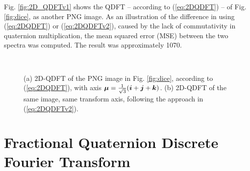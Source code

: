 Fig. \ref{fig:2D_QDFTv1} shows the QDFT -- according to (\ref{eq:2DQDFT}) -- of Fig. \ref{fig:dice}, as another PNG image. As an illustration of the difference in using (\ref{eq:2DQDFT}) or (\ref{eq:2DQDFTv2}), caused by the lack of commutativity in quaternion multiplication, the mean squared error (MSE) between the two spectra was computed. The result was approximately 1070. %



\begin{figure}
\centering
{}~
\caption{(a) 2D-QDFT of the PNG image in Fig. \ref{fig:dice}, according to (\ref{eq:2DQDFT}), with axis $ \boldsymbol{\mu} = \frac{1}{\sqrt{3}}(\boldsymbol{i} + \boldsymbol{j} + \boldsymbol{k}) $. (b) 2D-QDFT of the same image, same transform axis, following the approach in (\ref{eq:2DQDFTv2}).}
\label{fig:QDFT}
\end{figure}

\section{Fractional Quaternion Discrete Fourier Transform}
\label{sec:FrQDFT}

